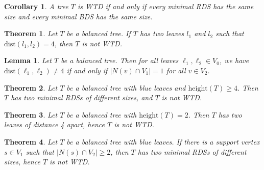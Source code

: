 \documentclass[10pt,a4paper]{amsart}
\newtheorem{lemma}{Lemma}
\newtheorem{corollary}{Corollary}
\newtheorem{theorem}{Theorem}
\newcommand{\dist}{\text{dist}}
\newcommand{\hei}{\mbox{height}}
\newcommand{\hh}{\mbox{height}}
\begin{document}
\begin{corollary}\label{cor. WTD iff RDBD WTD}
    A tree $T$ is WTD if and only if every minimal RDS has the same size and every minimal BDS has the same size.
\end{corollary}

\begin{theorem}\label{thm. P5 -> Mix}
Let $T$ be a balanced tree. If $T$ has two leaves $l_1$ and $l_2$ such that $\dist(l_1,l_2) = 4$, then $T$ is not WTD. 
\end{theorem}

\begin{lemma}\label{lem. no 4-path iff |N(v) cap V_1| = 1}
    Let $T$ be a balanced tree.
    Then for all leaves $\ell_1,\ell_2 \in V_0$, we have $\dist(\ell_1,\ell_2) \neq 4$ if and only if $|N(v) \cap V_1| = 1$ for all $v \in V_2$.
\end{lemma}

\begin{theorem}
\label{thm. height >= 4 is not WTD}
Let $T$ be a balanced tree with blue leaves and $\hh(T) \geq 4$. 
Then $T$ has two minimal RDSs of different sizes, and $T$ is not WTD.
\end{theorem}

\begin{theorem}
\label{thm. height(T)=2 -> not WTD}
Let $T$ be a balanced tree with $\hei(T) = 2$.
Then $T$ has two leaves of distance 4 apart, hence $T$ is not WTD.
\end{theorem}

\begin{theorem}
\label{thm. |N(s) cap V_2| > 1 -> not WTD}
Let $T$ be a balanced tree with blue leaves.
If there is a support vertex $s \in V_1$ such that $|N(s) \cap V_2| \geq 2$, then $T$ has two minimal RDSs of different sizes, hence $T$ is not WTD.
\end{theorem}
\end{document}
